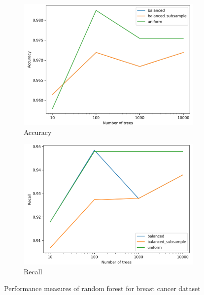 \documentclass[a4paper,11pt]{article}
\begin{document}
        \begin{figure}[h!]
            \centering
            \begin{subfigure}[c]{0.45\textwidth}
                \centering
                \includegraphics[width=1\textwidth]{exercise_1/paper/figures/breast-cancer-accuracy-random_forest.png}
                \caption{Accuracy}
                \label{fig:breast-cancer_random-forest_accuracy}
            \end{subfigure}
            \begin{subfigure}[c]{0.45\textwidth}
                \centering
                \includegraphics[width=1\textwidth]{exercise_1/paper/figures/breast-cancer-recall-random_forest.png}
                \caption{Recall}
                \label{fig:breast-cancer_random-forest_recall}
            \end{subfigure}
            \caption{Performance measures of random forest for breast cancer dataset}
            \label{fig:breast-cancer_random-forest}
        \end{figure}
        
\end{document}
